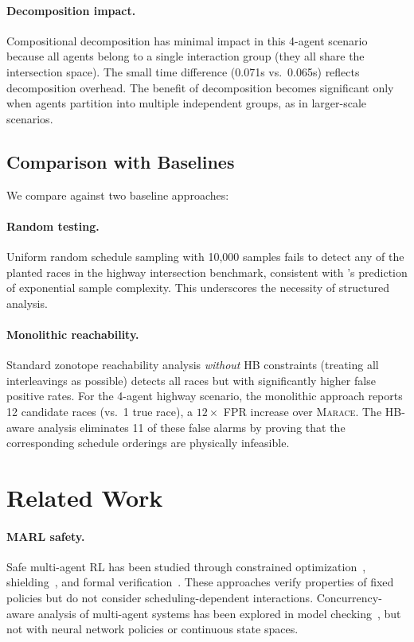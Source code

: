 \documentclass[11pt]{article}
\newcommand{\marace}{\textsc{Marace}}
\begin{document}
\paragraph{Decomposition impact.}
Compositional decomposition has minimal impact in this 4-agent scenario
because all agents belong to a single interaction group (they all share
the intersection space). The small time difference (0.071s vs.\ 0.065s)
reflects decomposition overhead. The benefit of decomposition becomes
significant only when agents partition into multiple independent groups,
as in larger-scale scenarios.

\subsection{Comparison with Baselines}

We compare against two baseline approaches:

\paragraph{Random testing.}
Uniform random schedule sampling with 10,000 samples fails to detect any
of the planted races in the highway intersection benchmark, consistent
with 's prediction of exponential sample complexity.
This underscores the necessity of structured analysis.

\paragraph{Monolithic reachability.}
Standard zonotope reachability analysis \emph{without} HB constraints
(treating all interleavings as possible) detects all races but with
significantly higher false positive rates. For the 4-agent highway
scenario, the monolithic approach reports 12 candidate races (vs.\ 1
true race), a $12\times$ FPR increase over \marace{}. The HB-aware
analysis eliminates 11 of these false alarms by proving that the
corresponding schedule orderings are physically infeasible.

\section{Related Work}
\label{sec:related}

\paragraph{MARL safety.}
Safe multi-agent RL has been studied through constrained optimization~\cite{altman1999constrained,zhang2020multi},
shielding~\cite{alshiekh2018safe,elsayed2021safe},
and formal verification~\cite{akintunde2020verifying,yan2022towards}.
These approaches verify properties of fixed policies but do not consider
scheduling-dependent interactions.
Concurrency-aware analysis of multi-agent systems has been explored in
model checking~\cite{lomuscio2017mcmas}, but not with neural network
policies or continuous state spaces.
\end{document}
